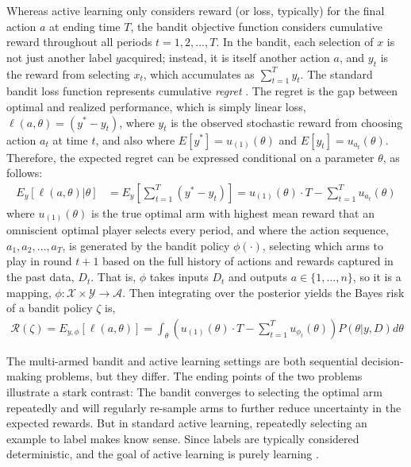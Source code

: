 \documentclass[nonblindrev]{informs3}
\newcommand{\numitems}{n}
\newcommand{\risk}{\mathcal{R}}
\begin{document}
Whereas active learning only considers reward (or loss, typically) for the final action $a$ at ending time $T$, the bandit objective function considers cumulative reward throughout all periods $t=1,2,...,T$. In the bandit, each selection of $x$ is not just another label $y$acquired; instead, it is itself another action $a$, and $y_t$ is the reward from selecting $x_t$, which accumulates as $\sum_{t=1}^{T} y_t$. The standard bandit loss function represents cumulative \emph{regret} \citep{Auer2002,LaiRobbins1985}. The regret is the gap between optimal and realized performance, which is simply linear loss, $\ell(a,\theta) = (y^{*} - y_t)$, where $y_t$ is the observed stochastic reward from choosing action $a_t$ at time $t$, and also where $E[y^{*}] = u_{(1)}(\theta)$ and $E[y_t] = u_{a_t}(\theta)$. Therefore, the expected regret can be expressed conditional on a parameter $\theta$, as follows:
\begin{align}
E_{y}\left[ \ell(a,\theta) | \theta \right] &= E_{y}\left[ \sum_{t=1}^{T} (y^{*} - y_t) \right] = u_{(1)}(\theta) \cdot T - \sum_{t=1}^{T} u_{a_t}(\theta) 
\end{align}
where $u_{(1)}(\theta)$ is the true optimal arm with highest mean reward that an omniscient optimal player selects every period, and where the action sequence, $a_1,a_2,\ldots,a_T$, is generated by the bandit policy $\phi(\cdot)$, selecting which arms to play in round $t+1$ based on the full history of actions and rewards captured in the past data, $D_t$. That is, $\phi$ takes inputs $D_{t}$ and outputs $a \in \{1,\ldots,\numitems\}$, so it is a mapping, $\phi: \mathcal{X} \times \mathcal{Y} \to \mathcal{A}$. Then integrating over the posterior yields the Bayes risk of a bandit policy $\zeta$ is,
\begin{align}
\risk(\zeta) = E_{y,\phi}\left[ \ell(a,\theta) \right] = 
\int_{\theta} \left(  u_{(1)}(\theta) \cdot T - \sum_{t=1}^{T} u_{\phi_t}(\theta) \right) P(\theta|y,D)  d\theta
\end{align}

The multi-armed bandit and active learning settings are both sequential decision-making problems, but they differ. The ending points of the two problems illustrate a stark contrast: The bandit converges to selecting the optimal arm repeatedly and will regularly re-sample arms to further reduce uncertainty in the expected rewards. But in standard active learning, repeatedly selecting an example to label makes know sense. Since labels are typically considered deterministic, and the goal of active learning is purely learning \citep{gantigray2013bridgealmab}. 
\end{document}
